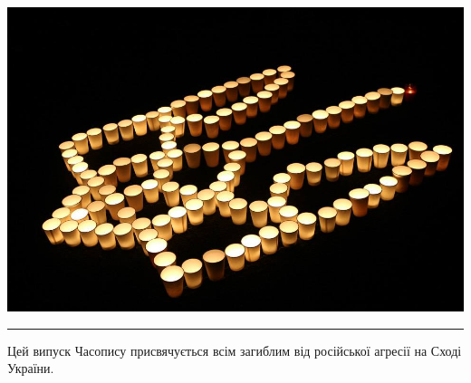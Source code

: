 \documentclass[10pt,a4paper]{article}
\newcommand{\SepRule}{\noindent							 %
						\begin{center}
							\rule{250pt}{1pt}
						\end{center}
						}
\begin{document}
\newpage

\begin{center}
\includegraphics[width=0.8\linewidth]{images/tryzub}
\SepRule			
Цей випуск Часопису присвячується всім загиблим від російської агресії на Сході України.
\end{center}
\end{document}
